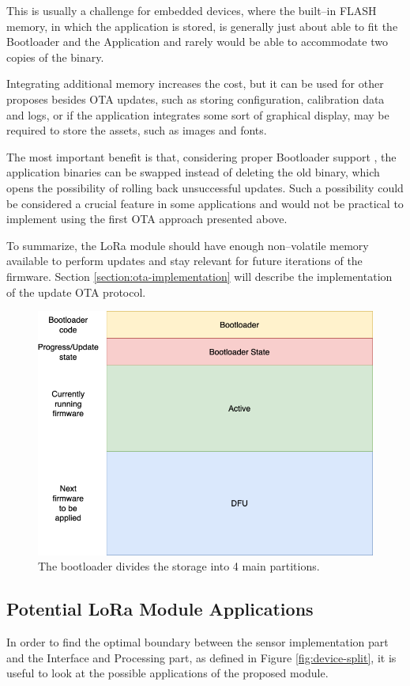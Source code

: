 This is usually a challenge for embedded devices, where the built--in FLASH memory, in which the application is stored, is generally just about able to fit the Bootloader and the Application and rarely would be able to accommodate two copies of the binary.

Integrating additional memory increases the cost, but it can be used for other proposes besides OTA updates, such as storing configuration, calibration data and logs, or if the application integrates some sort of graphical display, may be required to store the assets, such as images and fonts.

The most important benefit is that, considering proper Bootloader support \cite{drogue_iot_firmware_2024,embassy_project_documentation_bootloader_2024}, the application binaries can be swapped instead of deleting the old binary, which opens the possibility of rolling back unsuccessful updates. Such a possibility could be considered a crucial feature in some applications and would not be practical to implement using the first OTA approach presented above.

To summarize, the LoRa module should have enough non--volatile memory available to perform updates and stay relevant for future iterations of the firmware. Section \ref{section:ota-implementation} will describe the implementation of the update OTA protocol.

\begin{figure}
    \includegraphics[width=.6\textwidth]{fig/bootloader_flash.png}
    \caption{\label{fig:bootloader-flash}The bootloader divides the storage into 4 main partitions.}
\end{figure}

\subsection{\label{section:application-case-studies}Potential LoRa Module Applications}
In order to find the optimal boundary between the sensor implementation part and the Interface and Processing part, as defined in Figure \ref{fig:device-split}, it is useful to look at the possible applications of the proposed module.

